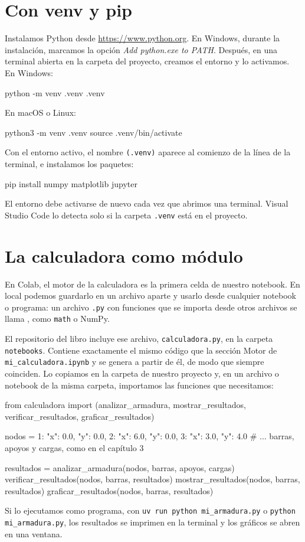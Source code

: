 \section{Con venv y pip}\label{sec:c_venv}

Instalamos Python desde \url{https://www.python.org}. En Windows, durante la
instalación, marcamos la opción \emph{Add python.exe to PATH}. Después, en una
terminal abierta en la carpeta del proyecto, creamos el entorno y lo
activamos. En Windows:
\begin{consola}
python -m venv .venv
.venv\Scripts\activate
\end{consola}
En macOS o Linux:
\begin{consola}
python3 -m venv .venv
source .venv/bin/activate
\end{consola}
Con el entorno activo, el nombre \texttt{(.venv)} aparece al comienzo de la
línea de la terminal, e instalamos los paquetes:
\begin{consola}
pip install numpy matplotlib jupyter
\end{consola}
El entorno debe activarse de nuevo cada vez que abrimos una terminal. Visual
Studio Code lo detecta solo si la carpeta \texttt{.venv} está en el proyecto.

\section{La calculadora como módulo}\label{sec:c_modulo}

En Colab, el motor de la calculadora es la primera celda de nuestro notebook.
En local podemos guardarlo en un archivo aparte y usarlo desde cualquier
notebook o programa: un archivo \texttt{.py} con funciones que se importa
desde otros archivos se llama , como \texttt{math} o
NumPy.

El repositorio del libro incluye ese archivo, \texttt{calculadora.py}, en la
carpeta \texttt{notebooks}. Contiene exactamente el mismo código que la
sección Motor de \texttt{mi\_calculadora.ipynb} y se genera a partir de él, de
modo que siempre coinciden. Lo copiamos en la carpeta de nuestro proyecto y,
en un archivo o notebook de la misma carpeta, importamos las funciones que
necesitamos:
\begin{codigo}
from calculadora import (analizar_armadura,
                         mostrar_resultados,
                         verificar_resultados,
                         graficar_resultados)

nodos = {1: {"x": 0.0, "y": 0.0},
         2: {"x": 6.0, "y": 0.0},
         3: {"x": 3.0, "y": 4.0}}
# ... barras, apoyos y cargas, como en el capítulo 3

resultados = analizar_armadura(nodos, barras,
                               apoyos, cargas)
verificar_resultados(nodos, barras, resultados)
mostrar_resultados(nodos, barras, resultados)
graficar_resultados(nodos, barras, resultados)
\end{codigo}
Si lo ejecutamos como programa, con \texttt{uv run python mi\_armadura.py} o
\texttt{python mi\_armadura.py}, los resultados se imprimen en la terminal y
los gráficos se abren en una ventana.

